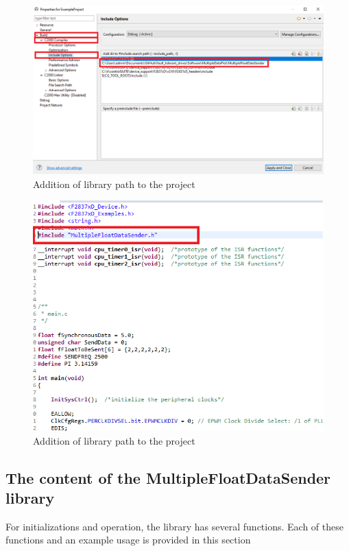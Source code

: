 \documentclass{article}
\begin{document}
\begin{figure}[H]
	\centering
	\includegraphics[scale=0.5]{Figures/libraryincludepath.png}
	\caption{Addition of library path to the project}
	\label{fig:libraryincludepath}
\end{figure}
\begin{figure}[H]
	\centering
	\includegraphics[scale=0.5]{Figures/includeheader.png}
	\caption{Addition of library path to the project}
	\label{fig:includeheader}
\end{figure}

\subsection{The content of the MultipleFloatDataSender library}
For initializations and operation, the library has several functions. Each of these functions and an example usage is provided in this section
\end{document}
